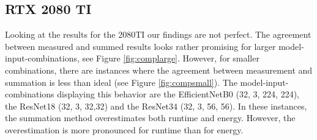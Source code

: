 \documentclass[conference]{IEEEtran}
\begin{document}
\subsection{RTX 2080 TI}
Looking at the results for the 2080TI our findings are not perfect. The agreement between measured and summed results looks rather promising for larger model-input-combinations, see Figure \ref{fig:complarge}. However, for smaller combinations, there are instances where the agreement between measurement and summation is less than ideal (see Figure \ref{fig:compsmall}). The model-input-combinations displaying this behavior are the EfficientNetB0 (32, 3, 224, 224), the ResNet18 (32, 3, 32,32) and the ResNet34 (32, 3, 56, 56). In these instances, the summation method overestimates both runtime and energy. However, the overestimation is more pronounced for runtime than for energy.

\end{document}
